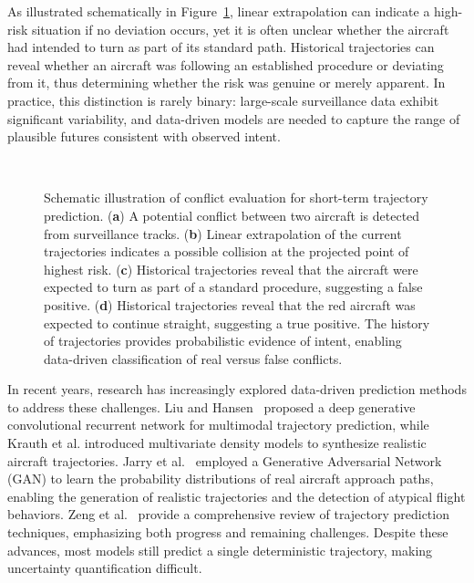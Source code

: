 \documentclass[
  manuscript=proceedings,  %
  layout=preprint,  %
  year=20xx,
  volume=x,
]{extra/joas}
\begin{document}
As illustrated schematically in Figure~\ref{fig:conflict_schematic}, linear extrapolation can indicate a high-risk situation if no deviation occurs, yet it is often unclear whether the aircraft had intended to turn as part of its standard path. 
Historical trajectories can reveal whether an aircraft was following an established procedure or deviating from it, thus determining whether the risk was genuine or merely apparent. 
In practice, this distinction is rarely binary: large-scale surveillance data exhibit significant variability, and data-driven models are needed to capture the range of plausible futures consistent with observed intent.

\begin{figure}[t]
    \centering
     \\
    \caption{Schematic illustration of conflict evaluation for short-term trajectory prediction. 
    (\textbf{a}) A potential conflict between two aircraft is detected from surveillance tracks. 
    (\textbf{b}) Linear extrapolation of the current trajectories indicates a possible collision at the projected point of highest risk. 
    (\textbf{c}) Historical trajectories reveal that the aircraft were expected to turn as part of a standard procedure, suggesting a false positive. 
    (\textbf{d}) Historical trajectories reveal that the red aircraft was expected to continue straight, suggesting a true positive. 
    The history of trajectories provides probabilistic evidence of intent, enabling data-driven classification of real versus false conflicts.}
    \label{fig:conflict_schematic}
\end{figure}

In recent years, research has increasingly explored data-driven prediction methods to address these challenges.
Liu and Hansen~\cite{liu2018predicting} proposed a deep generative convolutional recurrent network for multimodal trajectory prediction, while Krauth et al.\cite{krauth2021synthetic} introduced multivariate density models to synthesize realistic aircraft trajectories.
Jarry et al.~\cite{jarry2019use} employed a Generative Adversarial Network (GAN) to learn the probability distributions of real aircraft approach paths, enabling the generation of realistic trajectories and the detection of atypical flight behaviors.
Zeng et al.~\cite{zeng2022aircraft} provide a comprehensive review of trajectory prediction techniques, emphasizing both progress and remaining challenges. Despite these advances, most models still predict a single deterministic trajectory, making uncertainty quantification difficult.
\end{document}
